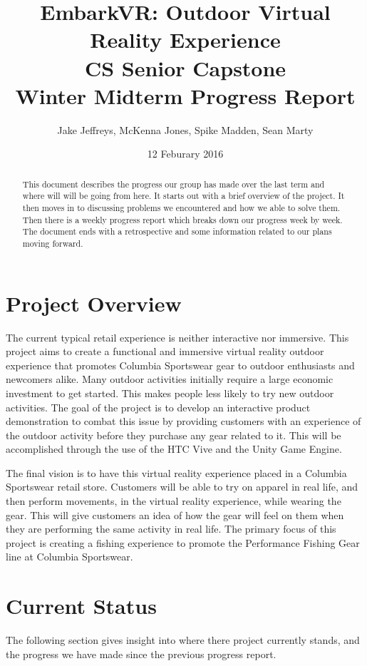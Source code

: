 \documentclass[10pt,journal,compsoc,onecolumn, draftclsnofoot]{IEEEtran}
\title{
EmbarkVR: Outdoor Virtual Reality Experience \\
CS Senior Capstone \\
Winter Midterm Progress Report\\
\vspace{1mm}
}
\author{Jake Jeffreys, McKenna Jones, Spike Madden, Sean Marty}
\date{12 Feburary 2016}
\begin{document}
\begin{titlepage}
\maketitle
\vspace{1mm}
\begin{abstract}
This document describes the progress our group has made over the last term and where will will be going from here. It starts out with a brief overview of the project. It then moves in to discussing problems we encountered and how we able to solve them. Then there is a weekly progress report which breaks down our progress week by week. The document ends with a retrospective and some information related to our plans moving forward.
\end{abstract}
\vspace{1cm}
\end{titlepage}
\tableofcontents
\clearpage


\section{Project Overview}
The current typical retail experience is neither interactive nor immersive.
This project aims to create a functional and immersive virtual reality outdoor experience that promotes Columbia Sportswear gear to outdoor enthusiasts and newcomers alike.
Many outdoor activities initially require a large economic investment to get started.
This makes people less likely to try new outdoor activities.
The goal of the project is to develop an interactive product demonstration to combat this issue by providing customers with an experience of the outdoor activity before they purchase any gear related to it.
This will be accomplished through the use of the HTC Vive and the Unity Game Engine.

The final vision is to have this virtual reality experience placed in a Columbia Sportswear retail store.
Customers will be able to try on apparel in real life, and then perform movements, in the virtual reality experience, while wearing the gear.
This will give customers an idea of how the gear will feel on them when they are performing the same activity in real life.
The primary focus of this project is creating a fishing experience to promote the Performance Fishing Gear line at Columbia Sportswear.

\section{Current Status}
The following section gives insight into where there project currently stands, and the progress we have made since the previous progress report.
\end{document}
